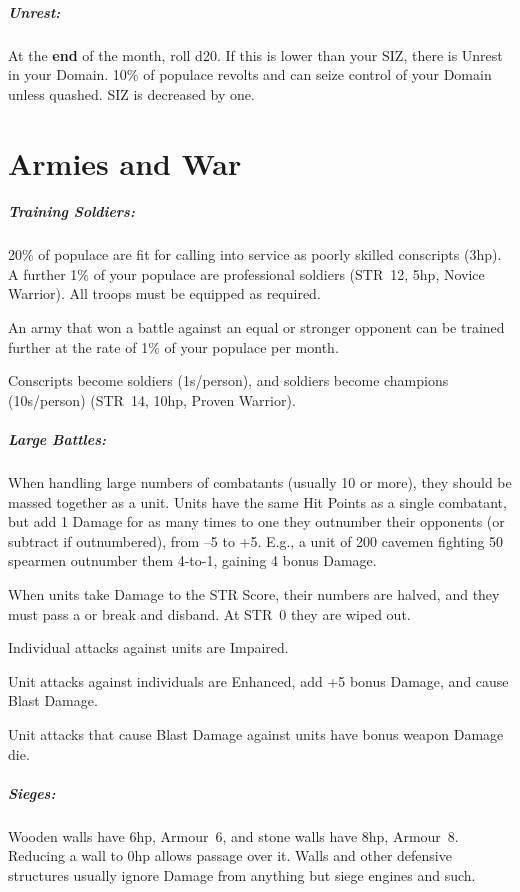 \documentclass[itdr/core]{subfiles}
\begin{document}
\subparagraph{Unrest:} At the \textbf{end} of the month, roll d20. If this is lower than your SIZ, there is Unrest in your Domain. 10\% of populace revolts and can seize control of your Domain unless quashed. SIZ is decreased by one.

\section{Armies and War}


\subparagraph{Training Soldiers:} 20\% of populace are fit for calling into service as poorly skilled conscripts (3hp). A further 1\% of your populace are professional soldiers (STR~12, 5hp, Novice Warrior). All troops must be equipped as required.

An army that won a battle against an equal or stronger opponent can be trained further at the rate of 1\% of your populace per month.

Conscripts become soldiers (1s/person), and \mbox{soldiers} become champions (10s/person) (STR~14, 10hp, Proven Warrior).

\subparagraph{Large Battles:} When handling large numbers of combatants (usually 10 or more), they should be massed together as a unit. Units have the same Hit Points as a single combatant, but add 1 Damage for as many times to one they outnumber their opponents (or subtract if outnumbered), from --5 to +5. E.g., a unit of 200 cavemen fighting 50 spearmen outnumber them \mbox{4-to-1}, gaining 4 bonus Damage.

When units take Damage to the STR Score, their numbers are halved, and they must pass a  or break and disband. At STR~0 they are wiped out.

Individual attacks against units are Impaired.

Unit attacks against individuals are Enhanced, add +5 bonus Damage, and cause Blast Damage.

Unit attacks that cause Blast Damage against units have bonus weapon Damage die.

\subparagraph{Sieges:} Wooden walls have 6hp, Armour~6, and stone walls have 8hp, Armour~8. Reducing a wall to 0hp allows passage over it. Walls and other defensive structures usually ignore Damage from anything but siege engines and such.
\end{document}
